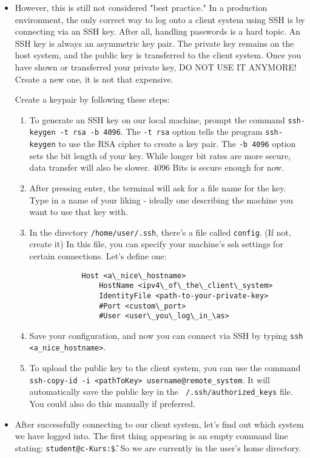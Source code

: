 \documentclass{dcbl/challenge}
\begin{document}
\begin{aufgabe}
\begin{itemize}
    \item However, this is still not considered "best practice." In a production environment, the only correct way to log onto a client system using SSH is by connecting via an SSH key. After all, handling passwords is a hard topic. An SSH key is always an asymmetric key pair. The private key remains on the host system, and the public key is transferred to the client system. Once you have shown or transferred your private key, DO NOT USE IT ANYMORE! Create a new one, it is not that expensive.
    
    Create a keypair by following these steps:
    \begin{enumerate}
        \item To generate an SSH key on our local machine, prompt the command \texttt{ssh-keygen -t rsa -b 4096}. The \texttt{-t rsa} option tells the program \texttt{ssh-keygen} to use the RSA cipher to create a key pair. The \texttt{-b 4096} option sets the bit length of your key. While longer bit rates are more secure, data transfer will also be slower. 4096 Bits is secure enough for now.
        \item After pressing enter, the terminal will ask for a file name for the key. Type in a name of your liking - ideally one describing the machine you want to use that key with.
        \item In the directory \texttt{/home/user/.ssh}, there's a file called \texttt{config}. (If not, create it) In this file, you can specify your machine's ssh settings for certain connections. Let's define one:
        \begin{lstlisting}
            Host <a\_nice\_hostname>
                HostName <ipv4\_of\_the\_client\_system>
                IdentityFile <path-to-your-private-key>
                #Port <custom\_port>
                #User <user\_you\_log\_in_\as>
        \end{lstlisting}
        \item Save your configuration, and now you can connect via SSH by typing \texttt{ssh <a\_nice\_hostname>}.
        \item To upload the public key to the client system, you can use the command \texttt{ssh-copy-id -i <pathToKey> username@remote\_system}. 
        It will automatically save the public key in the \texttt{~/.ssh/authorized\_keys} file. 
        You could also do this manually if preferred.
    \end{enumerate}

    \item After successfully connecting to our client system, let's find out which system we have logged into. The first thing appearing is an empty command line stating: \texttt{student@c-Kurs:\~\$}. So we are currently in the user's home directory.
    

\end{itemize}
\end{aufgabe}
\end{document}
